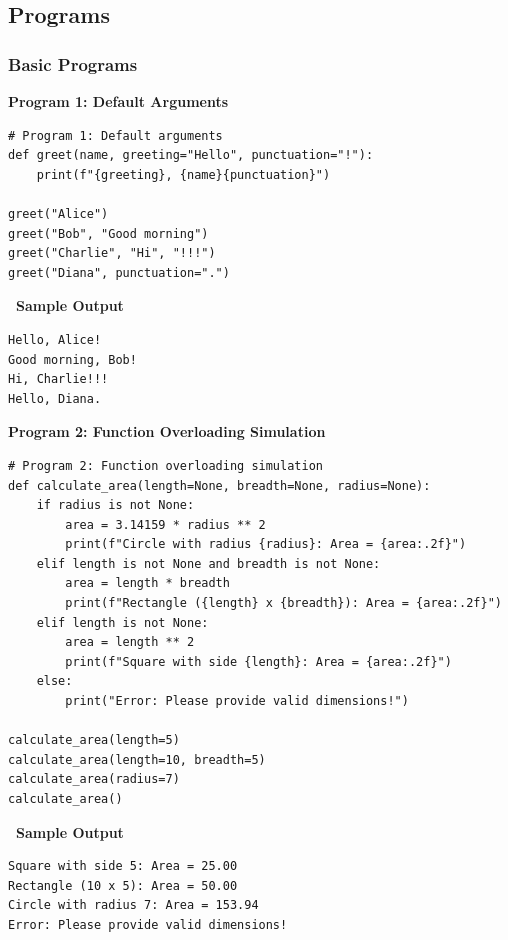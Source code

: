\documentclass[12pt,a4paper]{article}
\newcommand{\outhead}{\noindent\colorbox{cmrgreen!25}%
  {\textbf{\small\color{cmrdark}~Sample Output~}}\par\vspace{-1pt}}
\begin{document}
\subsection{Programs}
\subsubsection{Basic Programs}

\textbf{Program 1: Default Arguments}

\begin{lstlisting}
# Program 1: Default arguments
def greet(name, greeting="Hello", punctuation="!"):
    print(f"{greeting}, {name}{punctuation}")

greet("Alice")
greet("Bob", "Good morning")
greet("Charlie", "Hi", "!!!")
greet("Diana", punctuation=".")
\end{lstlisting}

\outhead
\begin{lstlisting}[style=outputstyle]
Hello, Alice!
Good morning, Bob!
Hi, Charlie!!!
Hello, Diana.
\end{lstlisting}

\vspace{0.5cm}

\textbf{Program 2: Function Overloading Simulation}

\begin{lstlisting}
# Program 2: Function overloading simulation
def calculate_area(length=None, breadth=None, radius=None):
    if radius is not None:
        area = 3.14159 * radius ** 2
        print(f"Circle with radius {radius}: Area = {area:.2f}")
    elif length is not None and breadth is not None:
        area = length * breadth
        print(f"Rectangle ({length} x {breadth}): Area = {area:.2f}")
    elif length is not None:
        area = length ** 2
        print(f"Square with side {length}: Area = {area:.2f}")
    else:
        print("Error: Please provide valid dimensions!")

calculate_area(length=5)
calculate_area(length=10, breadth=5)
calculate_area(radius=7)
calculate_area()
\end{lstlisting}

\outhead
\begin{lstlisting}[style=outputstyle]
Square with side 5: Area = 25.00
Rectangle (10 x 5): Area = 50.00
Circle with radius 7: Area = 153.94
Error: Please provide valid dimensions!
\end{lstlisting}

\vspace{0.5cm}
\end{document}
